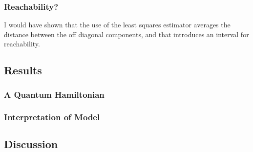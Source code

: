 \subsubsection{Reachability?}
I would have shown that the use of the least squares estimator averages the distance between the off diagonal components, and that introduces an interval for reachability. 
\subsection{Results}
\subsubsection{A Quantum Hamiltonian}
\subsubsection{Interpretation of Model}

\subsection{Discussion}







